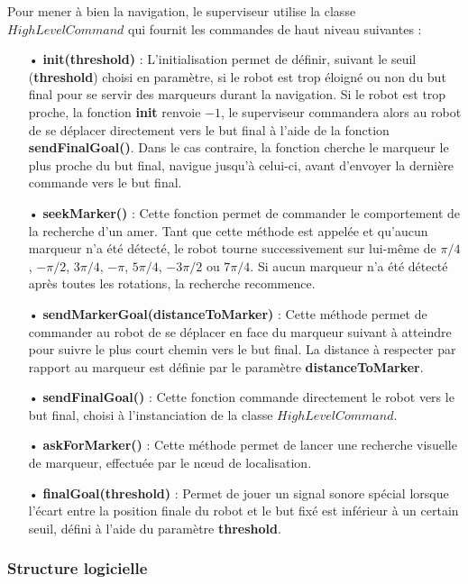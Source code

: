 \documentclass[10pt,a4paper]{article}
\begin{document}
Pour mener à bien la navigation, le superviseur utilise la classe $HighLevelCommand$ qui fournit les commandes de haut niveau suivantes :

\begin{itemize}
\item[•] \textbf{init(threshold)} : L'initialisation permet de définir, suivant le seuil (\textbf{threshold}) choisi en paramètre, si le robot est trop éloigné ou non du but final pour se servir des marqueurs durant la navigation. Si le robot est trop proche, la fonction \textbf{init} renvoie $-1$, le superviseur commandera alors au robot de se déplacer directement vers le but final à l'aide de la fonction \textbf{sendFinalGoal()}. Dans le cas contraire, la fonction cherche le marqueur le plus proche du but final, navigue jusqu'à celui-ci, avant d'envoyer la dernière commande vers le but final.
\item[•] \textbf{seekMarker()} : Cette fonction permet de commander le comportement de la recherche d'un amer. Tant que cette méthode est appelée et qu'aucun marqueur n'a été détecté, le robot tourne successivement sur lui-même de $\pi/4$, $-\pi/2$, $3\pi/4$, $-\pi$, $5\pi/4$, $-3\pi/2$ ou $7\pi/4$. Si aucun marqueur n'a été détecté après toutes les rotations, la recherche recommence.
\item[•] \textbf{sendMarkerGoal(distanceToMarker)} : Cette méthode permet de commander au robot de se déplacer en face du marqueur suivant à atteindre pour suivre le plus court chemin vers le but final. La distance à respecter par rapport au marqueur est définie par le paramètre \textbf{distanceToMarker}. 
\item[•] \textbf{sendFinalGoal()} : Cette fonction commande directement le robot vers le but final, choisi à l'instanciation de la classe $HighLevelCommand$.
\item[•] \textbf{askForMarker()} :  Cette méthode permet de lancer une recherche visuelle de marqueur, effectuée par le nœud de localisation.
\item[•] \textbf{finalGoal(threshold)} : Permet de jouer un signal sonore spécial lorsque l'écart entre la position finale du robot et le but fixé est inférieur à un certain seuil, défini à l'aide du paramètre \textbf{threshold}.
\end{itemize}

\newpage
\subsubsection{Structure logicielle}
\label{sec:StructureLogicielle}
\end{document}
